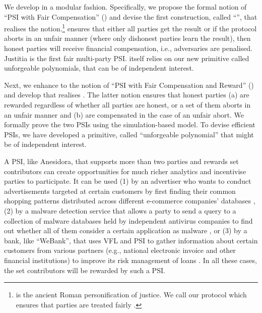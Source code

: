 


We develop \withRew in a modular fashion. Specifically, we propose the formal notion of ``PSI with Fair Compensation'' (\p) and devise the first construction, called ``\withFai'', that realises the notion.\footnote{\withFai is the ancient Roman personification of justice. We call our protocol which ensures that parties are treated fairly \withFai.} \p ensures that either all parties get the result or if the protocol aborts in an unfair manner (where only dishonest parties learn the result), then honest parties will receive financial compensation, i.e., adversaries are penalised. Justitia is the first fair multi-party PSI. \withFai itself relies on our new primitive called unforgeable polynomials, that can be of independent interest. 



Next, we enhance \p to the notion of ``PSI with Fair Compensation and Reward'' (\ep) and develop \withRew that realises \ep. The latter notion ensures that honest parties (a) are rewarded regardless of whether all parties are honest, or a set of them aborts in an unfair manner and (b) are compensated in the case of an unfair abort. We formally prove the two PSIs using the simulation-based model. To devise efficient PSIs, we have developed a primitive, called ``unforgeable polynomial'' that might be of independent interest. 

A PSI, like Anesidora, that supports more than two parties and rewards set contributors can create opportunities for much richer analytics and incentivise parties to participate. It can be used (1) by an advertiser who wants to conduct advertisements targeted at certain customers by first finding their common shopping patterns distributed across different e-commerce companies' databases \cite{IonKNPSS0SY20}, (2) by a malware detection service that allows a party to send a query to a collection of malware databases held by independent antivirus companies to find out whether all of them consider a certain application as malware \cite{TamrakarLPEPA17}, or (3) by a bank, like ``WeBank'', that uses VFL and PSI to gather information about certain customers from various partners (e.g., national electronic invoice and other financial institutions) to improve its risk management of loans \cite{ChengLCY20}. In all these cases, the set contributors will be rewarded by such a PSI. 



